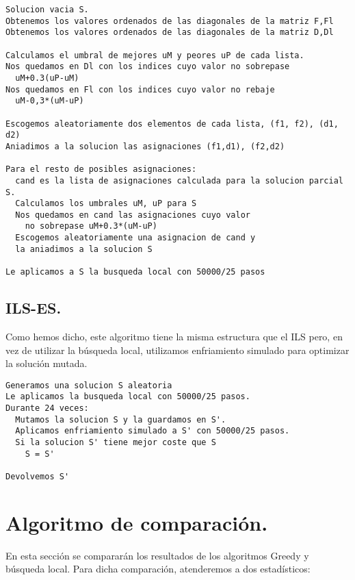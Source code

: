 \noindent\hrulefill
\begin{lstlisting}
Solucion vacia S.
Obtenemos los valores ordenados de las diagonales de la matriz F,Fl
Obtenemos los valores ordenados de las diagonales de la matriz D,Dl

Calculamos el umbral de mejores uM y peores uP de cada lista.
Nos quedamos en Dl con los indices cuyo valor no sobrepase
  uM+0.3(uP-uM)
Nos quedamos en Fl con los indices cuyo valor no rebaje
  uM-0,3*(uM-uP)

Escogemos aleatoriamente dos elementos de cada lista, (f1, f2), (d1, d2)
Aniadimos a la solucion las asignaciones (f1,d1), (f2,d2)

Para el resto de posibles asignaciones:
  cand es la lista de asignaciones calculada para la solucion parcial S.
  Calculamos los umbrales uM, uP para S
  Nos quedamos en cand las asignaciones cuyo valor 
    no sobrepase uM+0.3*(uM-uP)
  Escogemos aleatoriamente una asignacion de cand y
  la aniadimos a la solucion S

Le aplicamos a S la busqueda local con 50000/25 pasos
\end{lstlisting}
\noindent\hrulefill

\subsection{ILS-ES.}

Como hemos dicho, este algoritmo tiene la misma estructura que el ILS pero, en vez de utilizar la búsqueda local, utilizamos enfriamiento simulado para optimizar la solución mutada.

\noindent\hrulefill
\begin{lstlisting}
Generamos una solucion S aleatoria
Le aplicamos la busqueda local con 50000/25 pasos.
Durante 24 veces:
  Mutamos la solucion S y la guardamos en S'.
  Aplicamos enfriamiento simulado a S' con 50000/25 pasos.
  Si la solucion S' tiene mejor coste que S
    S = S'

Devolvemos S'
\end{lstlisting}
\noindent\hrulefill


\newpage

\section{Algoritmo de comparación.}
En esta sección se compararán los resultados de los algoritmos Greedy y búsqueda local. Para dicha comparación, atenderemos a dos estadísticos:\\

